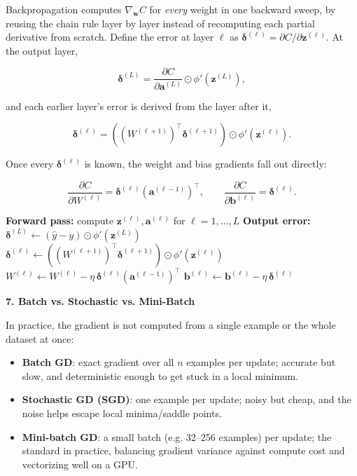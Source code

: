 \documentclass[conference]{IEEEtran}
\begin{document}
Backpropagation computes $\nabla_{\mathbf{w}} C$ for \emph{every} weight
in one backward sweep, by reusing the chain rule layer by layer instead
of recomputing each partial derivative from scratch. Define the error at
layer $\ell$ as $\boldsymbol{\delta}^{(\ell)} = \partial C /
\partial \mathbf{z}^{(\ell)}$. At the output layer,

\[
  \boldsymbol{\delta}^{(L)} = \frac{\partial C}{\partial \mathbf{a}^{(L)}} \odot \phi'\!\left(\mathbf{z}^{(L)}\right),
\]

and each earlier layer's error is derived from the layer after it,

\[
  \boldsymbol{\delta}^{(\ell)} = \left(\left(W^{(\ell+1)}\right)^{\top} \boldsymbol{\delta}^{(\ell+1)}\right) \odot \phi'\!\left(\mathbf{z}^{(\ell)}\right).
\]

Once every $\boldsymbol{\delta}^{(\ell)}$ is known, the weight and bias
gradients fall out directly:

\[
  \frac{\partial C}{\partial W^{(\ell)}} = \boldsymbol{\delta}^{(\ell)} \left(\mathbf{a}^{(\ell-1)}\right)^{\top},
  \qquad
  \frac{\partial C}{\partial \mathbf{b}^{(\ell)}} = \boldsymbol{\delta}^{(\ell)}.
\]

\begin{algorithm}[h]
\caption{Training one example}
\begin{algorithmic}[1]
\State \textbf{Forward pass:} compute $\mathbf{z}^{(\ell)}, \mathbf{a}^{(\ell)}$ for $\ell=1,\dots,L$
\State \textbf{Output error:} $\boldsymbol{\delta}^{(L)} \gets (\hat{y}-y)\odot\phi'(\mathbf{z}^{(L)})$
  \State $\boldsymbol{\delta}^{(\ell)} \gets \left((W^{(\ell+1)})^\top \boldsymbol{\delta}^{(\ell+1)}\right)\odot\phi'(\mathbf{z}^{(\ell)})$
\EndFor
{}
  \State $W^{(\ell)} \gets W^{(\ell)} - \eta\,\boldsymbol{\delta}^{(\ell)}(\mathbf{a}^{(\ell-1)})^\top$
  \State $\mathbf{b}^{(\ell)} \gets \mathbf{b}^{(\ell)} - \eta\,\boldsymbol{\delta}^{(\ell)}$
\EndFor
\end{algorithmic}
\end{algorithm}

\bigskip

\textbf{7. Batch vs. Stochastic vs. Mini-Batch}

In practice, the gradient is not computed from a single example or the
whole dataset at once:

\begin{itemize}
    \item \textbf{Batch GD}: exact gradient over all $n$ examples per
          update; accurate but slow, and deterministic enough to get
          stuck in a local minimum.
    \item \textbf{Stochastic GD (SGD)}: one example per update; noisy but
          cheap, and the noise helps escape local minima/saddle points.
    \item \textbf{Mini-batch GD}: a small batch (e.g. 32--256 examples)
          per update; the standard in practice, balancing gradient
          variance against compute cost and vectorizing well on a GPU.
\end{itemize}
\end{document}
